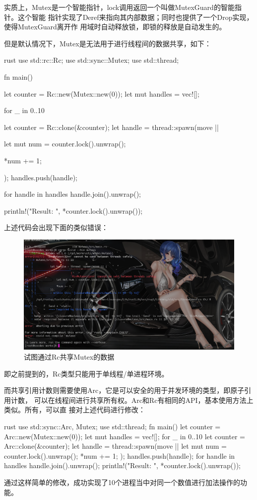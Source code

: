 实质上，Mutex是一个智能指针，lock调用返回一个叫做MutexGuard的智能指针。这个智能
指针实现了Deref来指向其内部数据；同时也提供了一个Drop实现，使得MutexGuard离开作
用域时自动释放锁，即锁的释放是自动发生的。

但是默认情况下，Mutex是无法用于进行线程间的数据共享，如下：
\begin{code-block}{rust}
use std::rc::Rc;
use std::sync::Mutex;
use std::thread;

fn main() {
    let counter = Rc::new(Mutex::new(0));
    let mut handles = vec![];

    for _ in 0..10 {
        let counter = Rc::clone(&counter);
        let handle = thread::spawn(move || {
            let mut num = counter.lock().unwrap();

            *num += 1;
        });
        handles.push(handle);
    }

    for handle in handles {
        handle.join().unwrap();
    }

    println!("Result: {}", *counter.lock().unwrap());
}
\end{code-block}
上述代码会出现下面的类似错误：
\begin{figure}[H]
  \centering
  \includegraphics[scale=0.215]{rust_mutex_share_error.png}
  \caption{试图通过Rc共享Mutex的数据}
  \label{fig:rust_mutex_share_error}
\end{figure}
即之前提到的，Rc类型只能用于单线程/单进程环境。

而共享引用计数则需要使用Arc，它是可以安全的用于并发环境的类型，即原子引用计数，
可以在线程间进行共享所有权。Arc和Rc有相同的API，基本使用方法上类似。所有，可以直
接对上述代码进行修改：
\begin{code-block}{rust}
use std::sync::{Arc, Mutex};
use std::thread;
fn main() {
    let counter = Arc::new(Mutex::new(0));
    let mut handles = vec![];
    for _ in 0..10 {
        let counter = Arc::clone(&counter);
        let handle = thread::spawn(move || {
            let mut num = counter.lock().unwrap();
            *num += 1;
        });
        handles.push(handle);
    }
    for handle in handles {
        handle.join().unwrap();
    }
    println!("Result: {}", *counter.lock().unwrap());
}
\end{code-block}
通过这样简单的修改，成功实现了10个进程当中对同一个数值进行加法操作的功能。

